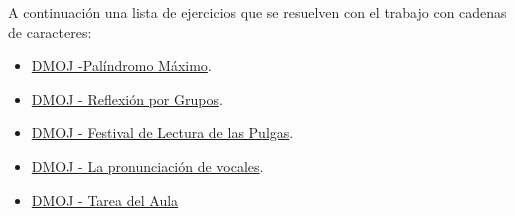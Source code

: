 A continuación una lista de ejercicios que se resuelven con el trabajo con cadenas de caracteres:

\begin{itemize}
	\item \href{https://dmoj.uclv.edu.cu/problem/maxpalind} {DMOJ -Palíndromo Máximo}. 
	\item \href{https://dmoj.uclv.edu.cu/problem/greflexion} {DMOJ - Reflexión por Grupos}.
	\item \href{https://dmoj.uclv.edu.cu/problem/festp} {DMOJ - Festival de Lectura de las Pulgas}.
	\item \href{https://dmoj.uclv.edu.cu/problem/cad} {DMOJ - La pronunciación de vocales}.
	\item \href{https://dmoj.uclv.edu.cu/problem/buka}{DMOJ - Tarea del Aula}
\end{itemize}